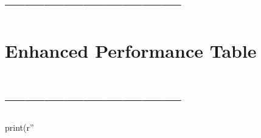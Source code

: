 \documentclass[
]{article}
\begin{document}
\section{---------------------------}\label{section}

\section{Enhanced Performance Table}\label{enhanced-performance-table}

\section{---------------------------}\label{section-1}

print(r''
\end{document}
